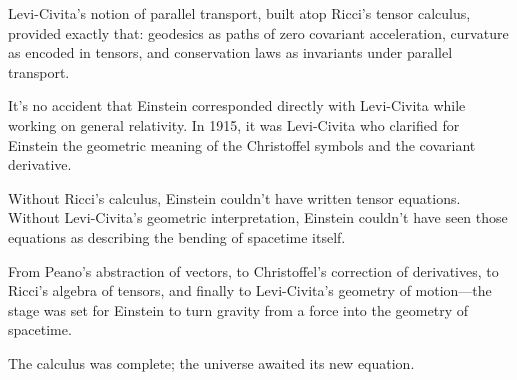 Levi-Civita’s notion of parallel transport, built atop Ricci’s tensor calculus, provided exactly that:  
geodesics as paths of zero covariant acceleration, curvature as encoded in tensors, and conservation laws as invariants under parallel transport.

\bigskip

It’s no accident that Einstein corresponded directly with Levi-Civita while working on general relativity.  
In 1915, it was Levi-Civita who clarified for Einstein the geometric meaning of the Christoffel symbols and the covariant derivative.

Without Ricci’s calculus, Einstein couldn’t have written tensor equations.  
Without Levi-Civita’s geometric interpretation, Einstein couldn’t have seen those equations as describing the bending of spacetime itself.

\bigskip

From Peano’s abstraction of vectors, to Christoffel’s correction of derivatives, to Ricci’s algebra of tensors, and finally to Levi-Civita’s geometry of motion—the stage was set for Einstein to turn gravity from a force into the geometry of spacetime.

The calculus was complete; the universe awaited its new equation.
